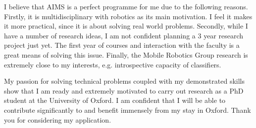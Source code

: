 \documentclass[12pt]{article}
\begin{document}
I believe that AIMS is a perfect programme for me due to the following reasons. Firstly, it is multidisciplinary with robotics as its main motivation. I feel it makes it more practical, since it is about solving real world problems. Secondly, while I have a number of research ideas, I am not confident planning a 3 year research project just yet. The first year of courses and interaction with the faculty is a great means of solving this issue. Finally, the Mobile Robotics Group research is extremely close to my interests, e.g. introspective capacity of classifiers.

My passion for solving technical problems coupled with my demonstrated skills show that I am ready and extremely motivated to carry out research as a PhD student at the University of Oxford. I am confident that I will be able to contribute significantly to and benefit immensely from my stay in Oxford. Thank you for considering my application.



\end{document}
